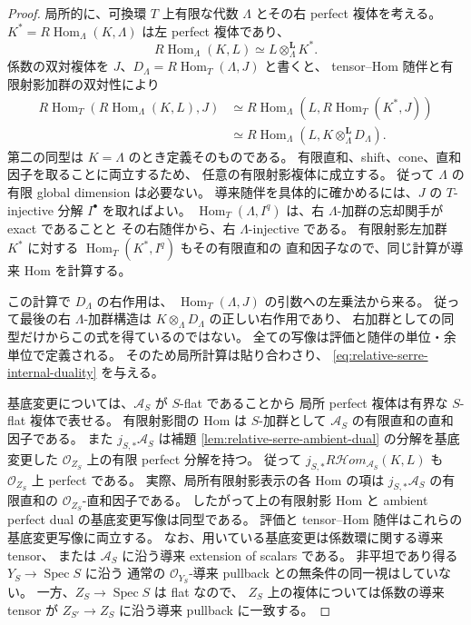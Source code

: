 \begin{proof}
局所的に、可換環 $T$ 上有限な代数 $\Lambda$ とその右 perfect 複体を考える。
$K^*=R\operatorname{Hom}_{\Lambda}(K,\Lambda)$ は左 perfect 複体であり、
\[
 R\operatorname{Hom}_{\Lambda}(K,L)
 \simeq L\otimes_{\Lambda}^{\mathbf L}K^*.
\]
係数の双対複体を $J$、$D_\Lambda=R\operatorname{Hom}_T(\Lambda,J)$ と書くと、
tensor--Hom 随伴と有限射影加群の双対性により
\begin{align*}
 R\operatorname{Hom}_T
  (R\operatorname{Hom}_{\Lambda}(K,L),J)
 &\simeq
 R\operatorname{Hom}_{\Lambda}
  (L,R\operatorname{Hom}_T(K^*,J))\\
 &\simeq
 R\operatorname{Hom}_{\Lambda}
  (L,K\otimes_{\Lambda}^{\mathbf L}D_\Lambda).
\end{align*}
第二の同型は $K=\Lambda$ のとき定義そのものである。
有限直和、shift、cone、直和因子を取ることに両立するため、
任意の有限射影複体に成立する。
従って $\Lambda$ の有限 global dimension は必要ない。
導来随伴を具体的に確かめるには、$J$ の $T$-injective 分解 $I^\bullet$ を取ればよい。
$\operatorname{Hom}_T(\Lambda,I^q)$ は、右 $\Lambda$-加群の忘却関手が exact であることと
その右随伴から、右 $\Lambda$-injective である。
有限射影左加群 $K^*$ に対する $\operatorname{Hom}_T(K^*,I^q)$ もその有限直和の
直和因子なので、同じ計算が導来 Hom を計算する。

この計算で $D_\Lambda$ の右作用は、
$\operatorname{Hom}_T(\Lambda,J)$ の引数への左乗法から来る。
従って最後の右 $\Lambda$-加群構造は
$K\otimes_\Lambda D_\Lambda$ の正しい右作用であり、
右加群としての同型だけからこの式を得ているのではない。
全ての写像は評価と随伴の単位・余単位で定義される。
そのため局所計算は貼り合わさり、
\eqref{eq:relative-serre-internal-duality} を与える。

基底変更については、$\mathscr A_S$ が $S$-flat であることから
局所 perfect 複体は有界な $S$-flat 複体で表せる。
有限射影間の Hom は $S$-加群として
$\mathscr A_S$ の有限直和の直和因子である。
また $j_{S,*}\mathscr A_S$ は補題
\ref{lem:relative-serre-ambient-dual} の分解を基底変更した
$\mathcal O_{Z_S}$ 上の有限 perfect 分解を持つ。
従って $j_{S,*}R\mathcal Hom_{\mathscr A_S}(K,L)$ も
$\mathcal O_{Z_S}$ 上 perfect である。
実際、局所有限射影表示の各 Hom の項は
$j_{S,*}\mathscr A_S$ の有限直和の $\mathcal O_{Z_S}$-直和因子である。
したがって上の有限射影 Hom と ambient perfect dual の基底変更写像は同型である。
評価と tensor--Hom 随伴はこれらの基底変更写像に両立する。
なお、用いている基底変更は係数環に関する導来 tensor、
または $\mathscr A_S$ に沿う導来 extension of scalars である。
非平坦であり得る $Y_S\to\operatorname{Spec}S$ に沿う
通常の $\mathcal O_{Y_S}$-導来 pullback との無条件の同一視はしていない。
一方、$Z_S\to\operatorname{Spec}S$ は flat なので、
$Z_S$ 上の複体については係数の導来 tensor が
$Z_{S'}\to Z_S$ に沿う導来 pullback に一致する。
\end{proof}

